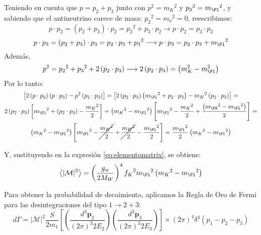 Teniendo en cuenta que $p=p_{2}+p_{3}$ junto con $p^2={m_K}^2$ y ${p_3}^2={m_{\Pl}}^2$, y sabiendo que el antineutrino carece de masa: ${p_2}^2={m_{\nu}}^2=0$, reescribimos:
\begin{equation}
p \cdot p_{2} = \left( p_{2}+ p_{3}\right) \cdot p_{2} = {p_2}^{2}+ p_{3} \cdot p_{2} \longrightarrow p\cdot p_{2}= p_{3} \cdot p_{2}
\end{equation}
\begin{equation}
p \cdot p_{3}=\left( p_{2}+ p_{3}\right) \cdot p_{3} = p_{2} \cdot p_{3}+ {p_{3}}^2 \longrightarrow p \cdot p_{3} = p_{2} \cdot p_{3}+{m_{\Pl}}^2
\end{equation}
Además,
\begin{equation}
p^{2}={p_{2}}^{2}+{p_3}^{2}+2\left( p_{2} \cdot p_{3}\right) \longrightarrow 2\left( p_{2} \cdot p_{3}\right)=\left( m_{K}^{2}-m_{\Pl}^{2}\right)
\end{equation}
Por lo tanto:
\begin{multline}
\left[ 2\left( p\cdot p_{2}\right) \left( p\cdot p_{3}\right) -p^{2}\left( p_{2}\cdot p_{3}\right) \right] = \left[ 2\left( p_{2}\cdot p_{3}\right) \left( {m_{\Pl}}^{2}+p_{2}\cdot p_{3}\right) -{m_{K}}^{2}\left( p_{2}\cdot p_{3}\right) \right] = \\ 2\left( p_{2} \cdot p_{3}\right) \left[ {m_{\Pl}}^{2}+\left( p_{2}\cdot p_{3}\right) -\dfrac{{m_K}^{2}}{2}\right] = \left({m_{K}}^{2}-{m_{\Pl}}^{2}\right) \left[{m_{\Pl}}^{2}-\dfrac{{m_K}^{2}}{2}+\dfrac{\left({m_{\PK}}^{2}-{m_{\Pl}}^{2}\right) }{2}\right] =\\ \left({m_{K}}^{2}-{m_{\Pl}}^{2}\right) \left[{m_{\Pl}}^{2}-\cancel{\dfrac{{m_{K}}^{2}}{2}}+\cancel{\dfrac{{m_{K}}^{2}}{2}}-\dfrac{{m_{\Pl}}^{2}}{2}\right] =\dfrac{{m_{\Pl}}^{2}}{2}\left( {m_{K}}^{2}-{m_{\Pl}}^{2}\right) 
\end{multline}

Y, sustituyendo en la expresión \ref{eq:elementomatrix}, se obtiene:
\begin{equation}
\left\langle |\mathcal{M}|^{2}\right\rangle=\left( \dfrac{g_w}{2M_W}\right)^{4} {f_K}^2 {m_{\Pl}}^{2}\left( {m_{K}}^{2}-{m_{\Pl}}^{2}\right)\label{eq:meanamplitude}
\end{equation}

Para obtener la probabilidad de decaimiento, aplicamos la Regla de Oro de Fermi para las desintegraciones del tipo $ 1 \rightarrow 2+3$:
\begin{equation}
d\Gamma =\left| \mathcal{M}\right| ^{2}\dfrac{S}{2m_{1}}\left[ \left( \dfrac{d^{3}\boldsymbol{p}_{2}}{\left( 2\pi \right) ^{3}2E_{2}}\right) \left( \dfrac{d^{3}\boldsymbol{p}_{3}}{\left( 2\pi \right) ^{3}2E_{3}}\right) \right] \times \left( 2\pi \right) ^{4}\delta ^{4}\left( p_{1}-p_{2}-p_{3}\right) 
\end{equation}

